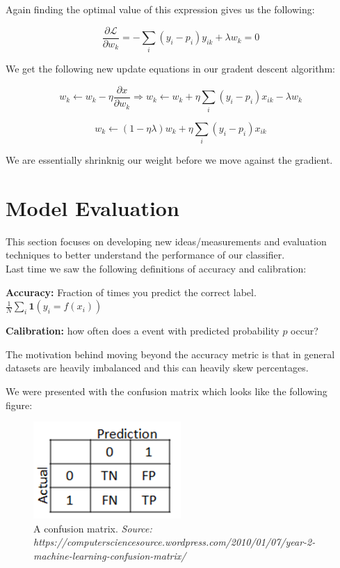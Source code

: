 Again finding the optimal value of this expression gives us the following:  

$$
\frac{ \partial \mathcal{L}}{\partial w_k} = - \sum_i (y_i - p_i)y_{ik} +\lambda w_{k} = 0
$$

We get the following new update equations in our gradent descent algorithm: 

$$
w_k \leftarrow w_k - \eta \frac{\partial x}{\partial w_k} \Rightarrow
w_k \leftarrow w_k + \eta \sum_i (y_i - p_i)x_{ik} - \lambda w_k
$$

\begin{equation}
w_k \leftarrow (1 - \eta \lambda) w_k + \eta \sum_i (y_i - p_i)x_{ik}
\end{equation}

We are essentially shrinknig our weight before we move against the gradient.  


\section{ Model Evaluation}

This section focuses on developing new ideas/measurements and evaluation techniques to better understand the performance of our classifier.  \\

Last time we saw the following definitions of accuracy and calibration: 

\textbf{Accuracy: } Fraction of times you predict the correct label. $\frac{1}{N} \sum_i \mathbf{1}(y_i = f(x_i) )$

\textbf{Calibration: } how often does a event with predicted probability $p$ occur?  

The motivation behind moving beyond the accuracy metric is that in general datasets are heavily imbalanced and this can heavily skew percentages.  

We were presented with the confusion matrix which looks like the following figure: 


\begin{figure}[ht]
  \begin{center}
    \includegraphics[width=0.5\textwidth]{figures/confusion_matrix.png}
    \caption{
      A confusion matrix. \textit{Source: https://computersciencesource.wordpress.com/2010/01/07/year-2-machine-learning-confusion-matrix/}}
    \label{Figure 2}
  \end{center}
\end{figure}

